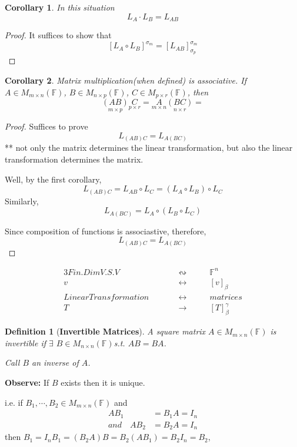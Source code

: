 \documentclass[12pt]{article}
\newtheorem{definition}{Definition}[subsection]
\newtheorem{corollary}{Corollary}[subsection]
\newcommand{\mF}{{\mathbb{F}}}
\begin{document}
	\begin{corollary}
		In this situation
		\[
			L_A \cdot L_B = L_{AB}
		\]
	\end{corollary}
	\begin{proof}
		It suffices to show that 
		\[
			[L_A \circ L_B]^{\sigma_m} = [L_{AB}]_{\sigma_p}^{\sigma_m}
		\]
	\end{proof}

	\begin{corollary}
		Matrix multiplication(when defined) is associative. 
		If $A\in M_{m\times n}(\mF)$, $B \in M_{n\times p}(\mF)$, 
		$C \in M_{p\times r}(\mF)$, then 
		\[
			\underset{m\times p}{(AB)}\underset{p\times r}{C} = 
			\underset{m\times n}{A}\underset{n\times r}{(BC)} = 
		\]
	\end{corollary}
	\begin{proof}
		Suffices to prove
		\[
			L_{(AB)C} = L_{A(BC)}
		\]
		** not only the matrix determines the linear transformation, but also
		the linear transformation determines the matrix.

		Well, by the first corollary,  
		\[
			L_{(AB)C}  = L_{AB} \circ L_C = (L_A\circ L_B) \circ L_C
		\]
		Similarly, 
		\[
			L_{A(BC)} = L_A\circ (L_B \circ L_C)
		\]

		Since composition of functions is associastive, therefore,
		\[
			L_{(AB)C} = L_{A(BC)}
		\]
	\end{proof}

	\begin{alignat*}{3}
		Fin. Dim V.S. V & &\qquad \leftrightsquigarrow \qquad & \mF^n\\
		 v & & \qquad \leftrightarrow \qquad & [v]_{\beta}\\
		 Linear Transformation & & \qquad \leftrightarrow \qquad & matrices\\
		 T & &\qquad \longrightarrow \qquad & [T]_{\beta}^{\gamma}
	\end{alignat*}



	\begin{definition}[\textbf{Invertible Matrices}]
		A square matrix $A \in M_{m\times n}(\mF)$ is invertible if $\exists$
		$B \in M_{n\times n}(\mF)$s.t. $AB=BA$.

		Call $B$ an inverse of $A$.
	\end{definition}
	\textbf{Observe: } If $B$ exists then it is unique. 

	i.e. if $B_1,\cdots, B_2 \in M_{m\times n}(\mF)$ and 
	\begin{align*}
		AB_1 &= B_1A = I_n\\
		and \quad AB_2 &= B_2A = I_n
	\end{align*}
	then $B_1 = I_nB_1 = (B_2A)B = B_2(AB_1) = B_2I_n = B_2$,
	
\end{document}
